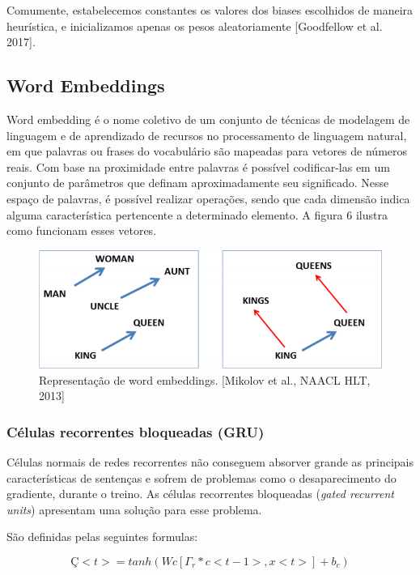 \documentclass[12pt]{article}
\begin{document}
Comumente, estabelecemos constantes os valores dos biases escolhidos de maneira heurística, e inicializamos apenas os pesos aleatoriamente [Goodfellow et al. 2017].

\subsection{Word Embeddings}

Word embedding é o nome coletivo de um conjunto de técnicas de modelagem de linguagem e de aprendizado de recursos no processamento de linguagem natural, em que palavras ou frases do vocabulário são mapeadas para vetores de números reais. Com base na proximidade entre palavras é possível codificar-las em um conjunto de parâmetros que definam aproximadamente seu significado. Nesse espaço de palavras, é possível realizar operações, sendo que cada dimensão indica alguma característica pertencente a determinado elemento. A figura 6 ilustra como funcionam esses vetores.
\begin{figure}
  \centering
  \includegraphics[width=1\textwidth]{images/wordembeddings.png}
  \caption{
    Representação de word embeddings. [Mikolov et al., NAACL HLT, 2013]
  }
  \label{}
\end{figure}

\subsubsection{Células recorrentes bloqueadas (GRU)}

Células normais de redes recorrentes não conseguem absorver grande as principais características de sentenças e sofrem de problemas como o desaparecimento do gradiente, durante o treino. As células recorrentes bloqueadas (\textit{gated recurrent units}) apresentam uma solução para esse problema.

São definidas pelas seguintes formulas:

\begin{equation}
    Ç<t> = tanh(Wc[\Gamma_r * c<t-1>, x<t>]+b_c)
\end{equation}
\end{document}
